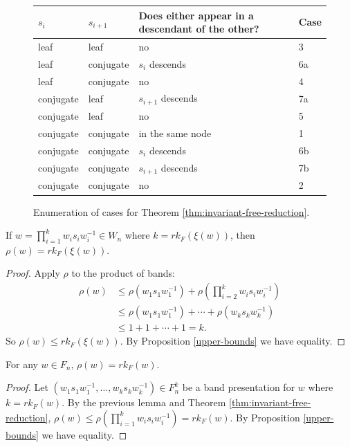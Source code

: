 \documentclass[12pt]{thesis}
\begin{document}
\begin{figure}[h]
    \centering
\begin{tabular}{ l l l | l}
    $s_{i}$ & $s_{i+1}$ & Does either appear in a descendant of the other? & Case \\
    \hline
    leaf & leaf & no & 3 \\
    leaf & conjugate & $s_{i}$ descends & 6a \\
    leaf & conjugate & no &  4 \\
    conjugate & leaf & $s_{i+1}$ descends &  7a \\
    conjugate & leaf & no &  5 \\
    conjugate & conjugate & in the same node & 1 \\
    conjugate & conjugate & $s_{i}$ descends & 6b \\
    conjugate & conjugate & $s_{i+1}$ descends & 7b \\
    conjugate & conjugate & no & 2\\
\end{tabular}
    \caption{Enumeration of cases for Theorem \ref{thm:invariant-free-reduction}.}
    \label{fig:case-analysis}
\end{figure}


\begin{lemma}
    If $w = \prod_{i=1}^{k} w_{i}s_{i}w_{i}^{-1} \in W_{n}$
    where $k = rk_{F}(\xi(w))$,
    then $\rho(w) = rk_{F}(\xi(w))$.
\end{lemma}

\begin{proof}
   Apply $\rho$ to the product of bands:
\[
\begin{split}
    \rho(w) &\leq \rho(w_{1}s_{1}w_{1}^{-1}) + \rho(\prod_{i=2}^{k} w_{i}s_{i}w_{i}^{-1}) \\
    &\leq \rho(w_{1}s_{1}w_{1}^{-1}) + \cdots + \rho(w_{k}s_{k}w_{k}^{-1}) \\
    &\leq 1 + 1 + \cdots + 1 = k.
\end{split}
\]
    So $\rho(w) \leq rk_{F}(\xi(w))$.
    By Proposition \ref{upper-bounds} we have equality.
\end{proof}

\begin{corollary}
    For any $w \in F_{n}$,
    $\rho(w) = rk_{F}(w)$. 
\end{corollary}

\begin{proof}
    Let $(w_{1}s_{1}w_{1}^{-1}, \ldots, w_{k}s_{k}w_{k}^{-1}) \in F_{n}^{k}$
    be a band presentation for $w$ where $k = rk_{F}(w)$.
    By the previous lemma and Theorem \ref{thm:invariant-free-reduction},
    $\rho(w) \leq \rho(\prod_{i=1}^{k} w_{i}s_{i}w_{i}^{-1}) = rk_{F}(w)$.
    By Proposition \ref{upper-bounds} we have equality.
\end{proof}
\end{document}
